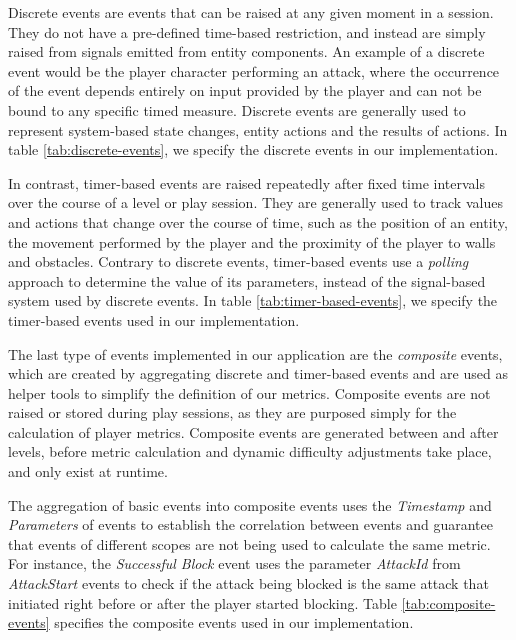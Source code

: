 Discrete events are events that can be raised at any given moment in a session. They do not have a pre-defined time-based restriction, and instead are simply raised from signals emitted from entity components. An example of a discrete event would be the player character performing an attack, where the occurrence of the event depends entirely on input provided by the player and can not be bound to any specific timed measure. Discrete events are generally used to represent system-based state changes, entity actions and the results of actions. In table \ref{tab:discrete-events}, we specify the discrete events in our implementation.



In contrast, timer-based events are raised repeatedly after fixed time intervals over the course of a level or play session. They are generally used to track values and actions that change over the course of time, such as the position of an entity, the movement performed by the player and the proximity of the player to walls and obstacles. Contrary to discrete events, timer-based events use a \emph{polling} approach to determine the value of its parameters, instead of the signal-based system used by discrete events. In table \ref{tab:timer-based-events}, we specify the timer-based events used in our implementation.



The last type of events implemented in our application are the \emph{composite} events, which are created by aggregating discrete and timer-based events and are used as helper tools to simplify the definition of our metrics. Composite events are not raised or stored during play sessions, as they are purposed simply for the calculation of player metrics. Composite events are generated between and after levels, before metric calculation and dynamic difficulty adjustments take place, and only exist at runtime.

The aggregation of basic events into composite events uses the \emph{Timestamp} and \emph{Parameters} of events to establish the correlation between events and guarantee that events of different scopes are not being used to calculate the same metric. For instance, the \emph{Successful Block} event uses the parameter \emph{AttackId} from \emph{AttackStart} events to check if the attack being blocked is the same attack that initiated right before or after the player started blocking. Table \ref{tab:composite-events} specifies the composite events used in our implementation. 


